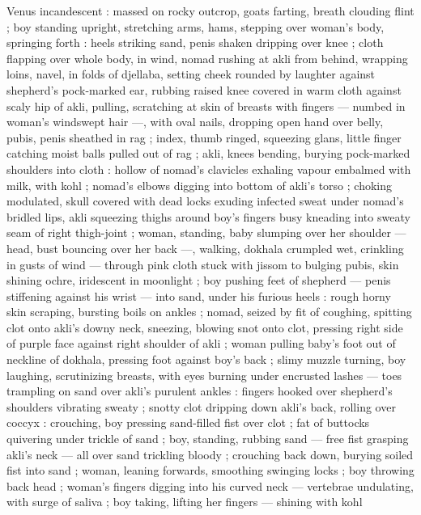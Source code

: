 Venus incandescent : massed on rocky outcrop, goats farting, breath 
clouding flint ; boy standing upright, stretching arms, hams, stepping 
over woman's body, springing forth : heels striking sand, penis 
shaken dripping over knee ; cloth flapping over whole body, in wind, 
nomad rushing at akli from behind, wrapping loins, navel, in folds of 
djellaba, setting cheek rounded by laughter against shepherd's 
pock-marked ear, rubbing raised knee covered in warm cloth against 
scaly hip of akli, pulling, scratching at skin of breasts with fingers --- 
numbed in woman's windswept hair ---, with oval nails, dropping 
open hand over belly, pubis, penis sheathed in rag ; index, thumb 
ringed, squeezing glans, little finger catching moist balls pulled out 
of rag ; akli, knees bending, burying pock-marked shoulders into 
cloth : hollow of nomad's clavicles exhaling vapour embalmed with 
milk, with kohl ; nomad's elbows digging into bottom of akli's torso 
; choking modulated, skull covered with dead locks exuding infected 
sweat under nomad's bridled lips, akli squeezing thighs around boy's 
fingers busy kneading into sweaty seam of right thigh-joint ; woman, 
standing, baby slumping over her shoulder --- head, bust bouncing 
over her back ---, walking, dokhala crumpled wet, crinkling in gusts 
of wind --- through pink cloth stuck with jissom to bulging pubis, skin 
shining ochre, iridescent in moonlight ; boy pushing feet of shepherd 
--- penis stiffening against his wrist --- into sand, under his furious 
heels : rough horny skin scraping, bursting boils on ankles ; nomad, 
seized by fit of coughing, spitting clot onto akli's downy neck, 
sneezing, blowing snot onto clot, pressing right side of purple face 
against right shoulder of akli ; woman pulling baby's foot out of 
neckline of dokhala, pressing foot against boy's back ; slimy muzzle 
turning, boy laughing, scrutinizing breasts, with eyes burning under 
encrusted lashes --- toes trampling on sand over akli's purulent 
ankles : fingers hooked over shepherd's shoulders vibrating sweaty 
; snotty clot dripping down akli's back, rolling over coccyx : 
crouching, boy pressing sand-filled fist over clot ; fat of buttocks 
quivering under trickle of sand ; boy, standing, rubbing sand --- free 
fist grasping akli's neck --- all over sand trickling bloody ; crouching 
back down, burying soiled fist into sand ; woman, leaning forwards, 
smoothing swinging locks ; boy throwing back head ; woman's 
fingers digging into his curved neck --- vertebrae undulating, with 
surge of saliva ; boy taking, lifting her fingers --- shining with kohl 
